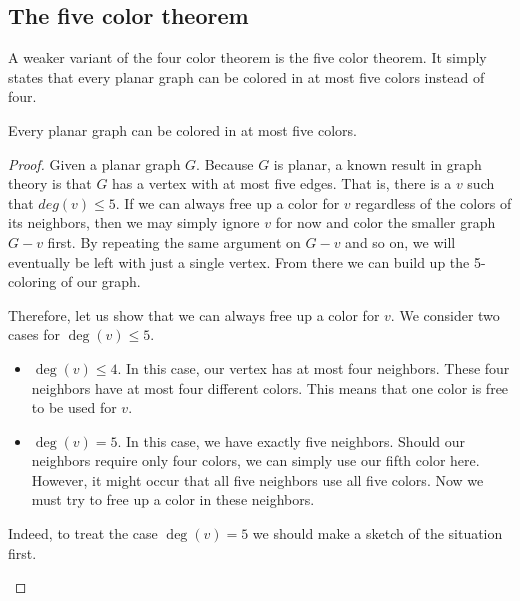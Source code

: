 \needspace{6cm}
\subsection{The five color theorem}
A weaker variant of the four color theorem is the five color theorem. It simply states that every planar graph can be colored in at most five colors instead of four.

\begin{theorem}
    Every planar graph can be colored in at most five colors.
\end{theorem}

\begin{proof}
Given a planar graph $G$. Because $G$ is planar, a known result in graph theory is that $G$ has a vertex with at most five edges. That is, there is a $v$ such that $deg(v) \leq 5$. If we can always free up a color for $v$ regardless of the colors of its neighbors, then we may simply ignore $v$ for now and color the smaller graph $G-v$ first. By repeating the same argument on $G-v$ and so on, we will eventually be left with just a single vertex. From there we can build up the 5-coloring of our graph.

Therefore, let us show that we can always free up a color for $v$. We consider two cases for $\deg(v) \leq 5$.

\begin{itemize}
    \item $\deg(v) \leq 4$. In this case, our vertex has at most four neighbors. These four neighbors have at most four different colors. This means that one color is free to be used for $v$.
    \item $\deg(v) = 5$. In this case, we have exactly five neighbors. Should our neighbors require only four colors, we can simply use our fifth color here. However, it might occur that all five neighbors use all five colors. Now we must try to free up a color in these neighbors.
\end{itemize}

Indeed, to treat the case $\deg(v)=5$ we should make a sketch of the situation first.

\begin{figure}[!h]
    \centering
\end{figure}
\end{proof}
